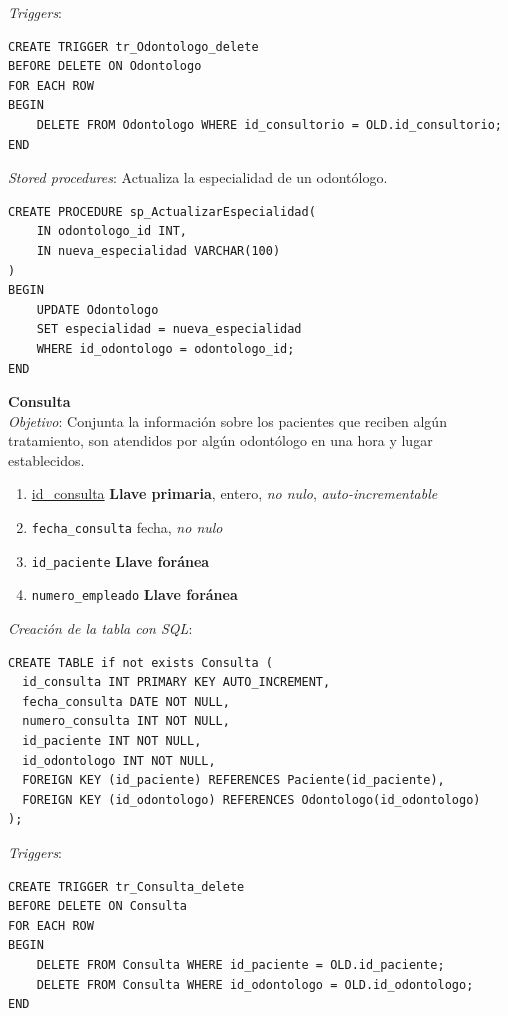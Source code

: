 \documentclass[a4paper,12pt]{article}
\begin{document}
\emph{Triggers}: 

\begin{verbatim}
CREATE TRIGGER tr_Odontologo_delete
BEFORE DELETE ON Odontologo
FOR EACH ROW
BEGIN
    DELETE FROM Odontologo WHERE id_consultorio = OLD.id_consultorio;
END
\end{verbatim}

\emph{Stored procedures}: Actualiza la especialidad de un odontólogo.

\begin{verbatim}
CREATE PROCEDURE sp_ActualizarEspecialidad(
    IN odontologo_id INT,
    IN nueva_especialidad VARCHAR(100)
)
BEGIN
    UPDATE Odontologo
    SET especialidad = nueva_especialidad
    WHERE id_odontologo = odontologo_id;
END
\end{verbatim}


\textbf{Consulta} \\ \emph{Objetivo}: Conjunta la información sobre los pacientes que reciben algún tratamiento, son atendidos por algún odontólogo en una hora y lugar establecidos.
\begin{enumerate}
	\item \underline{id\_consulta} \textbf{Llave primaria}, entero, \emph{no nulo}, \textit{auto-incrementable}
	\item \texttt{fecha\_consulta} fecha, \emph{no nulo}
	\item \texttt{id\_paciente} \textbf{Llave foránea}
	\item \texttt{numero\_empleado} \textbf{Llave foránea}
\end{enumerate}

\emph{Creación de la tabla con SQL}: 
\begin{verbatim}
CREATE TABLE if not exists Consulta (
  id_consulta INT PRIMARY KEY AUTO_INCREMENT,
  fecha_consulta DATE NOT NULL,
  numero_consulta INT NOT NULL,
  id_paciente INT NOT NULL,
  id_odontologo INT NOT NULL,
  FOREIGN KEY (id_paciente) REFERENCES Paciente(id_paciente),
  FOREIGN KEY (id_odontologo) REFERENCES Odontologo(id_odontologo)
);
\end{verbatim}

\emph{Triggers}: 

\begin{verbatim}
CREATE TRIGGER tr_Consulta_delete
BEFORE DELETE ON Consulta
FOR EACH ROW
BEGIN
    DELETE FROM Consulta WHERE id_paciente = OLD.id_paciente;
    DELETE FROM Consulta WHERE id_odontologo = OLD.id_odontologo;
END
\end{verbatim}
\end{document}
